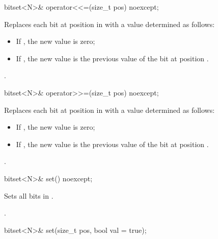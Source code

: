 %
\begin{itemdecl}
bitset<N>& operator<<=(size_t pos) noexcept;
\end{itemdecl}

\begin{itemdescr}
\pnum
\effects
Replaces each bit at position  in
with a value determined as follows:

\begin{itemize}
\item
If , the new value is zero;
\item
If , the new value is the previous
value of the bit at position .
\end{itemize}

\pnum
\returns
{}.
\end{itemdescr}

%
\begin{itemdecl}
bitset<N>& operator>>=(size_t pos) noexcept;
\end{itemdecl}

\begin{itemdescr}
\pnum
\effects
Replaces each bit at position  in
with a value determined as follows:

\begin{itemize}
\item
If , the new value is zero;
\item
If , the new value is the previous value of the bit at position .
\end{itemize}

\pnum
\returns
{}.
\end{itemdescr}

%
%
\begin{itemdecl}
bitset<N>& set() noexcept;
\end{itemdecl}

\begin{itemdescr}
\pnum
\effects
Sets all bits in
.

\pnum
\returns
{}.
\end{itemdescr}

%
%
\begin{itemdecl}
bitset<N>& set(size_t pos, bool val = true);
\end{itemdecl}


